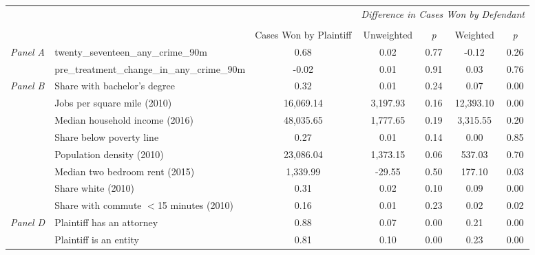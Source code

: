 \begin{tabular}{llccccc}
\toprule
 &  & \textit{} & \multicolumn{4}{c}{\textit{Difference in Cases Won by Defendant}} \\
\cline{4-7}
\\
 &  & Cases Won by Plaintiff & Unweighted & \emph{p} & Weighted & \emph{p} \\
\midrule
\multirow[c]{2}{3cm}{\textit{Panel A}} & twenty_seventeen_any_crime_90m & 0.68 & 0.02 & 0.77 & -0.12 & 0.26 \\
 & pre_treatment_change_in_any_crime_90m & -0.02 & 0.01 & 0.91 & 0.03 & 0.76 \\
\cline{1-7}
\multirow[c]{8}{3cm}{\textit{Panel B}} & Share with bachelor's degree & 0.32 & 0.01 & 0.24 & 0.07 & 0.00 \\
 & Jobs per square mile (2010) & 16,069.14 & 3,197.93 & 0.16 & 12,393.10 & 0.00 \\
 & Median household income (2016) & 48,035.65 & 1,777.65 & 0.19 & 3,315.55 & 0.20 \\
 & Share below poverty line & 0.27 & 0.01 & 0.14 & 0.00 & 0.85 \\
 & Population density (2010) & 23,086.04 & 1,373.15 & 0.06 & 537.03 & 0.70 \\
 & Median two bedroom rent (2015) & 1,339.99 & -29.55 & 0.50 & 177.10 & 0.03 \\
 & Share white (2010) & 0.31 & 0.02 & 0.10 & 0.09 & 0.00 \\
 & Share with commute $<$15 minutes (2010) & 0.16 & 0.01 & 0.23 & 0.02 & 0.02 \\
\cline{1-7}
\multirow[c]{2}{3cm}{\textit{Panel D}} & Plaintiff has an attorney & 0.88 & 0.07 & 0.00 & 0.21 & 0.00 \\
 & Plaintiff is an entity & 0.81 & 0.10 & 0.00 & 0.23 & 0.00 \\
\cline{1-7}
\bottomrule
\end{tabular}
